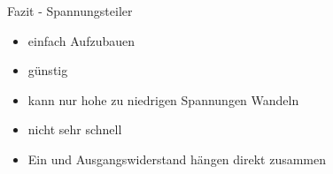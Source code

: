 
\begin{frame}[c]{Fazit - Spannungsteiler}

  \begin{itemize}
    \item einfach Aufzubauen
    \item günstig
    \item kann nur hohe zu niedrigen Spannungen Wandeln
    \item nicht sehr schnell
    \item Ein und Ausgangswiderstand hängen direkt zusammen
  \end{itemize}

\end{frame}
